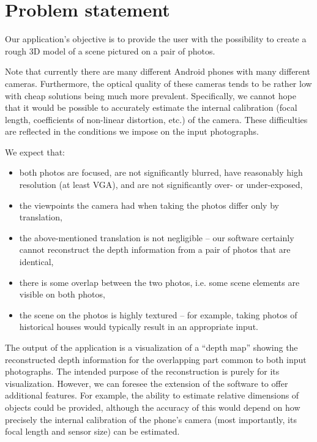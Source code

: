 
\section{Problem statement} 
\label{prob}

Our application's objective is to provide the user with the possibility to create a rough 3D model of a scene pictured on a pair of photos. 

Note that currently there are many different Android phones with many different cameras. 
Furthermore, the optical quality of these cameras tends to be rather low with cheap solutions being much more prevalent.
Specifically, we cannot hope that it would be possible to accurately estimate the internal calibration (focal length, coefficients of non-linear distortion, etc.) of the camera. 
These difficulties are reflected in the conditions we impose on the input photographs.

We expect that: 
\begin{itemize}
\item both photos are focused, are not significantly blurred, have reasonably high resolution (at least VGA), and are not significantly over- or under-exposed, 
\item the viewpoints the camera had when taking the photos differ only by translation, 
\item the above-mentioned translation is not negligible -- our software certainly cannot reconstruct the depth information from a pair of photos that are identical,
\item there is some overlap between the two photos, i.e. some scene elements are visible on both photos,
\item the scene on the photos is highly textured -- for example, taking photos of historical houses would typically result in an appropriate input.
\end{itemize}

The output of the application is a visualization of a ``depth map'' showing the reconstructed depth information for the overlapping part common to both input photographs. 
The intended purpose of the reconstruction is purely for its visualization. 
However, we can foresee the extension of the software to offer additional features. 
For example, the ability to estimate relative dimensions of objects could be provided, although the accuracy of this would depend on how precisely the internal calibration of the phone's camera (most importantly, its focal length and sensor size) can be estimated. %
















